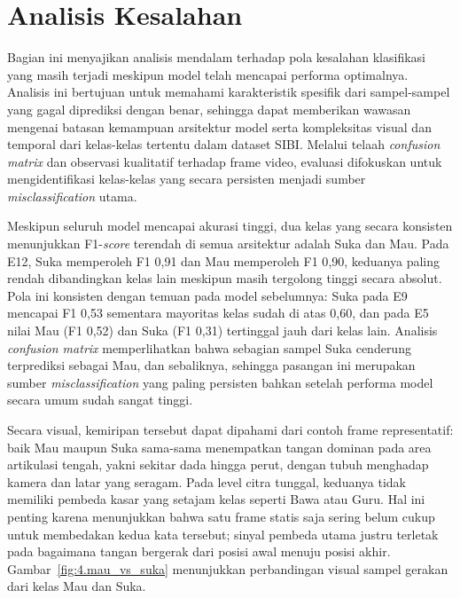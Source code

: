 
\section{Analisis Kesalahan} \label{IV.AnalisisKesalahan}

Bagian ini menyajikan analisis mendalam terhadap pola kesalahan klasifikasi yang masih terjadi meskipun model telah mencapai performa optimalnya. Analisis ini bertujuan untuk memahami karakteristik spesifik dari sampel-sampel yang gagal diprediksi dengan benar, sehingga dapat memberikan wawasan mengenai batasan kemampuan arsitektur model serta kompleksitas visual dan temporal dari kelas-kelas tertentu dalam dataset SIBI. Melalui telaah \textit{confusion matrix} dan observasi kualitatif terhadap frame video, evaluasi difokuskan untuk mengidentifikasi kelas-kelas yang secara persisten menjadi sumber \textit{misclassification} utama.\par

Meskipun seluruh model mencapai akurasi tinggi, dua kelas yang secara konsisten menunjukkan F1-\textit{score} terendah di semua arsitektur adalah Suka dan Mau. Pada E12, Suka memperoleh F1 0{,}91 dan Mau memperoleh F1 0{,}90, keduanya paling rendah dibandingkan kelas lain meskipun masih tergolong tinggi secara absolut. Pola ini konsisten dengan temuan pada model sebelumnya: Suka pada E9 mencapai F1 0{,}53 sementara mayoritas kelas sudah di atas 0{,}60, dan pada E5 nilai Mau (F1 0{,}52) dan Suka (F1 0{,}31) tertinggal jauh dari kelas lain. Analisis \textit{confusion matrix} memperlihatkan bahwa sebagian sampel Suka cenderung terprediksi sebagai Mau, dan sebaliknya, sehingga pasangan ini merupakan sumber \textit{misclassification} yang paling persisten bahkan setelah performa model secara umum sudah sangat tinggi.\par

Secara visual, kemiripan tersebut dapat dipahami dari contoh frame representatif: baik Mau maupun Suka sama-sama menempatkan tangan dominan pada area artikulasi tengah, yakni sekitar dada hingga perut, dengan tubuh menghadap kamera dan latar yang seragam. Pada level citra tunggal, keduanya tidak memiliki pembeda kasar yang setajam kelas seperti Bawa atau Guru. Hal ini penting karena menunjukkan bahwa satu frame statis saja sering belum cukup untuk membedakan kedua kata tersebut; sinyal pembeda utama justru terletak pada bagaimana tangan bergerak dari posisi awal menuju posisi akhir. Gambar~\ref{fig:4.mau_vs_suka} menunjukkan perbandingan visual sampel gerakan dari kelas Mau dan Suka.\par

